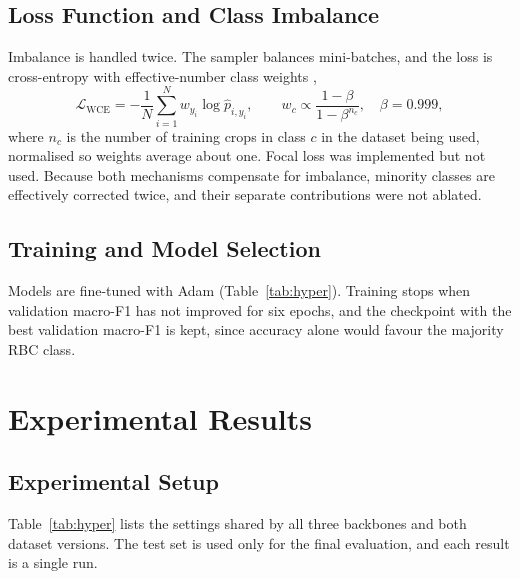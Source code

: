 \documentclass[11pt,a4paper]{article}
\begin{document}
\subsection{Loss Function and Class Imbalance}

Imbalance is handled twice. The sampler balances mini-batches, and the loss is cross-entropy with effective-number class weights \citep{cui2019class},
\[
\mathcal{L}_{\text{WCE}} = -\frac{1}{N}\sum_{i=1}^{N} w_{y_i} \log \hat{p}_{i, y_i}, \qquad w_c \propto \frac{1-\beta}{1-\beta^{n_c}}, \quad \beta = 0.999,
\]
where \(n_c\) is the number of training crops in class \(c\) in the dataset being used, normalised so weights average about one. Focal loss \citep{lin2017focal} was implemented but not used. Because both mechanisms compensate for imbalance, minority classes are effectively corrected twice, and their separate contributions were not ablated.

\subsection{Training and Model Selection}

Models are fine-tuned with Adam \citep{kingma2015adam} (Table~\ref{tab:hyper}). Training stops when validation macro-F1 has not improved for six epochs, and the checkpoint with the best validation macro-F1 is kept, since accuracy alone would favour the majority RBC class.

\section{Experimental Results}\label{sec:results}

\subsection{Experimental Setup}\label{sec:setup}

Table~\ref{tab:hyper} lists the settings shared by all three backbones and both dataset versions. The test set is used only for the final evaluation, and each result is a single run.
\end{document}
